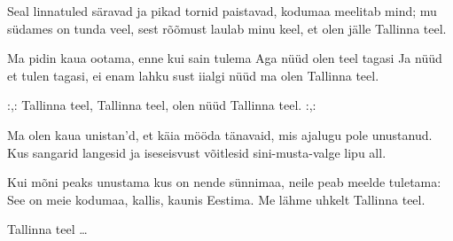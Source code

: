 Seal linnatuled s\"aravad
ja pikad tornid paistavad,
kodumaa meelitab mind;
mu s\"udames on tunda veel,
sest r\~o\~omust laulab minu keel,
et olen j\"alle Tallinna teel.

Ma pidin kaua ootama, 
enne kui sain tulema
Aga n\"u\"ud olen teel tagasi
Ja n\"u\"ud et tulen tagasi,
ei enam lahku sust iialgi
n\"u\"ud ma olen Tallinna teel.

:,: Tallinna teel, Tallinna teel,
olen n\"u\"ud Tallinna teel. :,:

Ma olen kaua unistan'd,
et k\"aia m\"o\"oda t\"anavaid,
mis ajalugu pole unustanud.
Kus sangarid langesid
ja iseseisvust v\~oitlesid
sini-musta-valge lipu all.

Kui m\~oni peaks unustama
kus on nende s\"unnimaa,
neile peab meelde tuletama:
See on meie kodumaa,
kallis, kaunis Eestima.
Me l\"ahme uhkelt Tallinna teel.

Tallinna teel \ldots